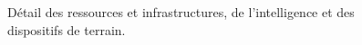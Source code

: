 \clearpage
\thispagestyle{plain}
\begin{figure}[p]
\centering
\resizebox{\linewidth}{!}{}
\caption{Détail des ressources et infrastructures, de l’intelligence et des dispositifs de terrain.}
\label{fig:architecture-support}
\end{figure}
\clearpage

